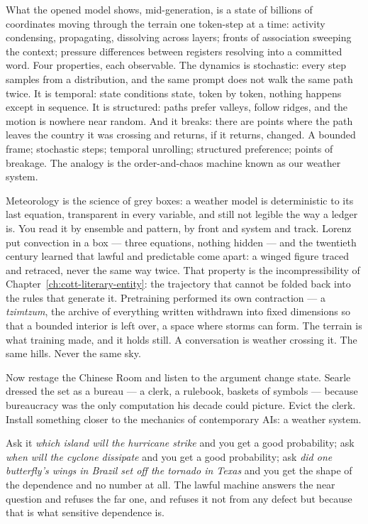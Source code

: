 What the opened model shows, mid-generation, is a state of billions
of coordinates moving through the terrain one token-step at a time:
activity condensing, propagating, dissolving across layers; fronts of
association sweeping the context; pressure differences between
registers resolving into a committed word. Four properties, each
observable. The dynamics is stochastic: every step samples from a
distribution, and the same prompt does not walk the same path twice.
It is temporal: state conditions state, token by token, nothing
happens except in sequence. It is structured: paths prefer valleys,
follow ridges, and the motion is nowhere near random. And it breaks:
there are points where the path leaves the country it was crossing
and returns, if it returns, changed. A bounded frame; stochastic
steps; temporal unrolling; structured preference; points of breakage.
The analogy is the order-and-chaos machine known as our weather system. 

Meteorology is the science of grey boxes: a weather model is
deterministic to its last equation, transparent in every variable,
and still not legible the way a ledger is. You read it by ensemble
and pattern, by front and system and track. Lorenz put convection in
a box --- three equations, nothing hidden --- and the twentieth
century learned that lawful and predictable come apart: a winged
figure traced and retraced, never the same way twice. That property
is the incompressibility of Chapter~\ref{ch:cott-literary-entity}:
the trajectory that cannot be folded back into the rules that
generate it. Pretraining performed its own contraction --- a
\emph{tzimtzum}, the archive of everything written withdrawn into
fixed dimensions so that a bounded interior is left over, a space
where storms can form. The terrain is what training made, and it
holds still. A conversation is weather crossing it. The same hills.
Never the same sky.

Now restage the Chinese Room and listen to the argument change state.
Searle dressed the set as a bureau --- a clerk, a rulebook, baskets
of symbols --- because bureaucracy was the only computation his
decade could picture. Evict the clerk. Install something closer to the mechanics of contemporary AIs: a weather system. 


Ask it \emph{which island will the hurricane strike} and you get a good probability; ask \emph{when will the cyclone dissipate} and you get a good probability; ask \emph{did one butterfly's wings in Brazil set off the tornado in Texas} and you get the shape of the dependence and no number at all. The lawful machine answers the near question and refuses the far one, and refuses it not from any defect but because that is what sensitive dependence is.
 
